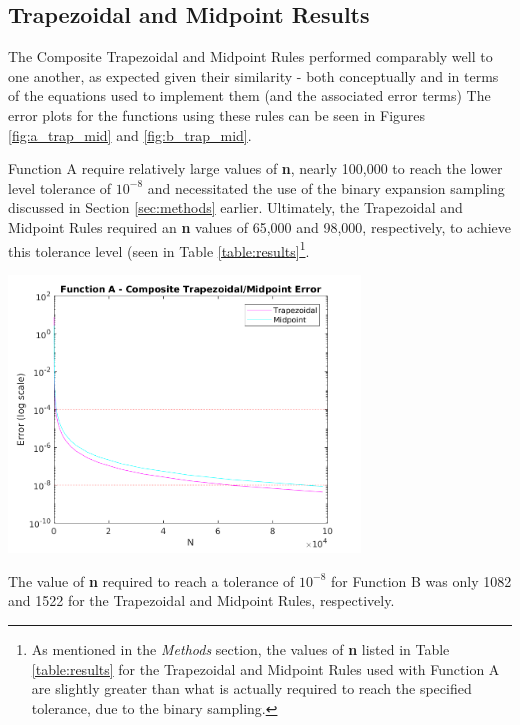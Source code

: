 \documentclass{article}
\begin{document}
\subsection{Trapezoidal and Midpoint Results}\label{results:a}

The Composite Trapezoidal and Midpoint Rules performed comparably well to one another, as expected given their similarity - both conceptually and in terms of the equations used to implement them (and the associated error terms) The error plots for the functions using these rules can be seen in Figures \ref{fig:a_trap_mid} and \ref{fig:b_trap_mid}.

Function A require relatively large values of \textbf{n}, nearly 100,000 to reach the lower level tolerance of $10^{-8}$ and necessitated the use of the binary expansion sampling discussed in Section \ref{sec:methods} earlier. Ultimately, the Trapezoidal and Midpoint Rules required an \textbf{n} values of 65,000 and 98,000, respectively, to achieve this tolerance level (seen in Table \ref{table:results}\footnote{As mentioned in the \textit{Methods} section, the values of \textbf{n} listed in Table \ref{table:results} for the Trapezoidal and Midpoint Rules used with Function A are slightly greater than what is actually required to reach the specified tolerance, due to the binary sampling.}.  

\begin{center}
	\includegraphics[width=0.7\textwidth]{../output/a_trapezoidal_midpoint.png}
	\label{fig:a_trap_mid}
\end{center}

The value of \textbf{n} required to reach a tolerance of $10^{-8}$ for Function B was only 1082 and 1522 for the Trapezoidal and Midpoint Rules, respectively.
\end{document}
